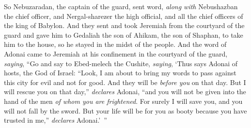 \begin{biblechapter}
\verse So Nebuzaradan, the captain of the guard, sent word, \textit{along with} Nebushazban the chief officer, and Nergal-sharezer the high official, and all the chief officers of the king of Babylon.
\verse And they sent and took Jeremiah from the courtyard of the guard and gave him to Gedaliah the son of Ahikam, the son of Shaphan, to take him to the house, so he stayed in the midst of the people.
 And the word of Adonai came to Jeremiah at his confinement in the courtyard of the guard, \textit{saying},
\verse “Go and say to Ebed-melech the Cushite, \textit{saying}, ‘Thus says Adonai of hosts, the God of Israel: “Look, I am about to bring my words to pass against this city for evil and not for good. And they will be \textit{before you} on that day.
\verse But I will rescue you on that day,” \textit{declares} Adonai, “and you will not be given into the hand of the men \textit{of whom you are frightened}.
\verse For surely I will save you, and you will not fall by the sword. But your life will be for you as booty because you have trusted in me,” \textit{declares} Adonai.’ ”
\end{biblechapter}

